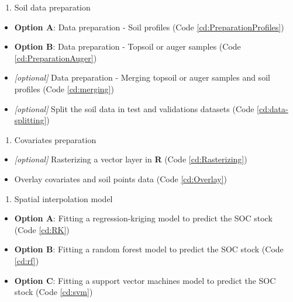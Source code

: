 \documentclass[10pt,b5paper,]{book}
\providecommand{\tightlist}{%
  \setlength{\itemsep}{0pt}\setlength{\parskip}{0pt}}
\theoremstyle{definition}
\theoremstyle{definition}
\theoremstyle{definition}
\theoremstyle{remark}
\begin{document}
\begin{enumerate}
\def\labelenumi{\arabic{enumi}.}
\tightlist
\item
  Soil data preparation
\end{enumerate}

\begin{itemize}
\tightlist
\item
  \textbf{Option A}: Data preparation - Soil profiles (Code
  \ref{cd:PreparationProfiles})
\item
  \textbf{Option B}: Data preparation - Topsoil or auger samples (Code
  \ref{cd:PreparationAuger})
\item
  \emph{{[}optional{]}} Data preparation - Merging topsoil or auger
  samples and soil profiles (Code \ref{cd:merging})
\item
  \emph{{[}optional{]}} Split the soil data in test and validations
  datasets (Code \ref{cd:data-splitting})
\end{itemize}

\begin{enumerate}
\def\labelenumi{\arabic{enumi}.}
\setcounter{enumi}{1}
\tightlist
\item
  Covariates preparation
\end{enumerate}

\begin{itemize}
\tightlist
\item
  \emph{{[}optional{]}} Rasterizing a vector layer in \textbf{R} (Code
  \ref{cd:Rasterizing})
\item
  Overlay covariates and soil points data (Code \ref{cd:Overlay})
\end{itemize}

\begin{enumerate}
\def\labelenumi{\arabic{enumi}.}
\setcounter{enumi}{2}
\tightlist
\item
  Spatial interpolation model
\end{enumerate}

\begin{itemize}
\tightlist
\item
  \textbf{Option A}: Fitting a regression-kriging model to predict the
  SOC stock (Code \ref{cd:RK})
\item
  \textbf{Option B}: Fitting a random forest model to predict the SOC
  stock (Code \ref{cd:rf})
\item
  \textbf{Option C}: Fitting a support vector machines model to predict
  the SOC stock (Code \ref{cd:svm})
\end{itemize}
\end{document}

